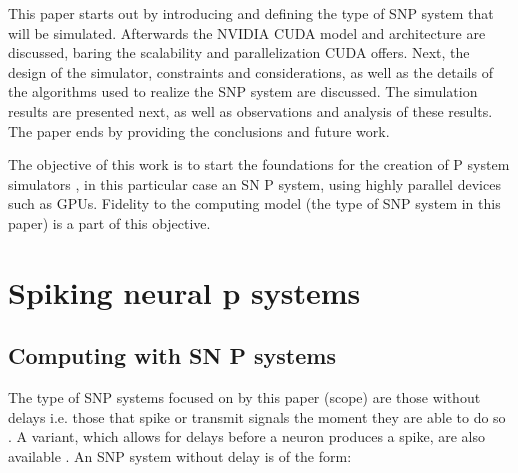 \documentclass{svmultm}
\begin{document}
This paper starts out by introducing and defining the type of SNP system that will be simulated. Afterwards the NVIDIA CUDA model and architecture are discussed, baring the scalability and parallelization CUDA offers. Next, the design of the simulator, constraints and considerations, as well as the details of the algorithms used to realize the SNP system are discussed. The simulation results are presented next, as well as observations and analysis of these results. The paper ends by providing the conclusions and future work.

The objective of this work is to start the foundations for the creation of P system simulators 
, in this particular case an SN P system, using highly parallel devices such as  {GPUs}. Fidelity to the computing model (the type of SNP system in this paper) is a part of this objective.




\section{Spiking neural p systems}

\subsection{Computing with SN P systems}\label{computesnp}
The type of SNP systems focused on by this paper (scope) are those without delays i.e. those that spike or transmit signals the moment they are able to do so \cite{snpbrain}\cite{snpmat}. A variant, which allows for delays before a neuron produces a spike, are also available \cite{snp}. An SNP system without delay is of the form:

\end{document}
